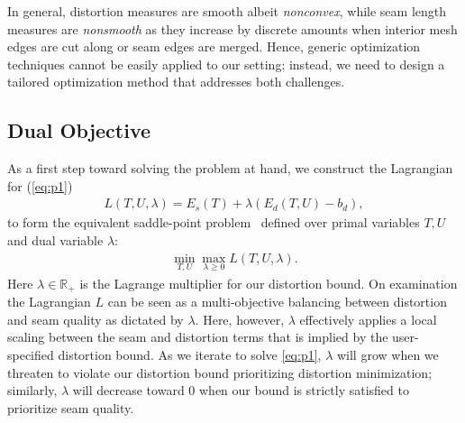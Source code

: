 In general, distortion measures are smooth albeit \emph{nonconvex}, while seam length measures are \emph{nonsmooth} as they increase by discrete amounts when interior mesh edges are cut along or seam edges are merged. Hence, generic optimization techniques cannot be easily applied to our setting; instead, we need to design a tailored optimization method that addresses both challenges.

%


\subsection{Dual Objective}
As a first step toward solving the problem at hand, we construct the Lagrangian for (\ref{eq:p1})  %
\begin{align}
	L(T,U,\lambda) = E_s(T) + \lambda(E_d(T,U) - b_d),
	\label{eq:L}
\end{align}
%
to form the equivalent saddle-point problem~\cite{Bertsekas:2016:NOP} defined over primal variables $T,U$ and dual variable $\lambda$:
%
\begin{align}
	\min_{T,U} \max_{\lambda\geq0} L(T,U,\lambda).
	\label{eq:p2}
\end{align}
%
Here $\lambda \in \mathbb{R_+}$ is the Lagrange multiplier for our distortion bound. On examination the Lagrangian $L$ can be seen as a multi-objective balancing between distortion and seam quality as dictated by $\lambda$. Here, however, $\lambda$ effectively applies a local scaling between the seam and distortion terms that is implied %
by the user-specified distortion bound. As we iterate to solve  \eqref{eq:p1}, $\lambda$ will grow when we threaten to violate our distortion bound  prioritizing distortion minimization; similarly, $\lambda$ will decrease toward $0$ when our bound is strictly satisfied to prioritize seam quality.


